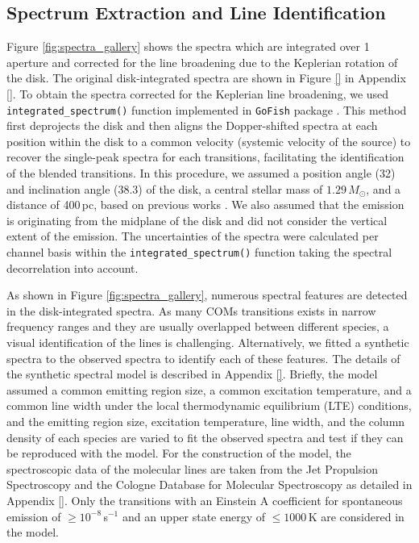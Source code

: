 \documentclass[linenumbers, twocolumn, twocolappendix, astrosymb, times]{aastex631}
\begin{document}
\subsection{Spectrum Extraction and Line Identification}\label{subsec:line_identification}
Figure \ref{fig:spectra_gallery} shows the spectra which are integrated over 1 aperture and corrected for the line broadening due to the Keplerian rotation of the disk. The original disk-integrated spectra are shown in Figure \ref{} in Appendix \ref{}. To obtain the spectra corrected for the Keplerian line broadening, we used \texttt{integrated\_spectrum()} function implemented in \texttt{GoFish} package \citep{GoFish}. This method first deprojects the disk and then aligns the Dopper-shifted spectra at each position within the disk to a common velocity (systemic velocity of the source) to recover the single-peak spectra for each transitions, facilitating the identification of the blended transitions. In this procedure, we assumed a position angle (32\arcdeg) and inclination angle (38.3\arcdeg) of the disk, a central stellar mass of $1.29\,M_\odot$, and a distance of 400\,pc, based on previous works \citep{Cieza2016, Tobin2023}. We also assumed that the emission is originating from the midplane of the disk and did not consider the vertical extent of the emission. The uncertainties of the spectra were calculated per channel basis within the \texttt{integrated\_spectrum()} function taking the spectral decorrelation \citep{Yen2016} into account.

As shown in Figure \ref{fig:spectra_gallery}, numerous spectral features are detected in the disk-integrated spectra. As many COMs transitions exists in narrow frequency ranges and they are usually overlapped between different species, a visual identification of the lines is challenging. Alternatively, we fitted a synthetic spectra to the observed spectra to identify each of these features. The details of the synthetic spectral model is described in Appendix \ref{}. Briefly, the model assumed a common emitting region size, a common excitation temperature, and a common line width under the local thermodynamic equilibrium (LTE) conditions, and the emitting region size, excitation temperature, line width, and the column density of each species are varied to fit the observed spectra and test if they can be reproduced with the model. For the construction of the model, the spectroscopic data of the molecular lines are taken from the Jet Propulsion Spectroscopy \citep[JPL;][]{JPL} and the Cologne Database for Molecular Spectroscopy \citep[CDMS;][]{CDMS1, CDMS2} as detailed in Appendix \ref{}. Only the transitions with an Einstein A coefficient for spontaneous emission of $\geq10^{-8}$\,s$^{-1}$ and an upper state energy of $\leq1000$\,K are considered in the model.
\end{document}
